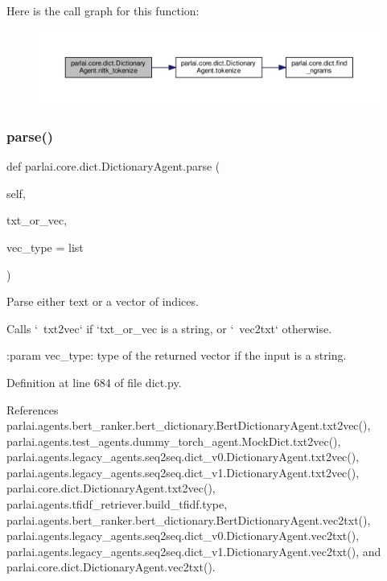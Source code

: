 Here is the call graph for this function\+:
\nopagebreak
\begin{figure}[H]
\begin{center}
\leavevmode
\includegraphics[width=350pt]{classparlai_1_1core_1_1dict_1_1DictionaryAgent_a73fe72e257ace6e8debf2c41995f8390_cgraph}
\end{center}
\end{figure}
\mbox{\label{classparlai_1_1core_1_1dict_1_1DictionaryAgent_ad34c4135329f6768d22d519c3c483d68}} 
\subsubsection{\texorpdfstring{parse()}{parse()}}
{\footnotesize\ttfamily def parlai.\+core.\+dict.\+Dictionary\+Agent.\+parse (\begin{DoxyParamCaption}\item[{}]{self,  }\item[{}]{txt\+\_\+or\+\_\+vec,  }\item[{}]{vec\+\_\+type = {\ttfamily list} }\end{DoxyParamCaption})}

\begin{DoxyVerb}Parse either text or a vector of indices.

Calls `~txt2vec` if `txt_or_vec is a string, or `~vec2txt` otherwise.

:param vec_type:
    type of the returned vector if the input is a string.
\end{DoxyVerb}
 

Definition at line 684 of file dict.\+py.



References parlai.\+agents.\+bert\+\_\+ranker.\+bert\+\_\+dictionary.\+Bert\+Dictionary\+Agent.\+txt2vec(), parlai.\+agents.\+test\+\_\+agents.\+dummy\+\_\+torch\+\_\+agent.\+Mock\+Dict.\+txt2vec(), parlai.\+agents.\+legacy\+\_\+agents.\+seq2seq.\+dict\+\_\+v0.\+Dictionary\+Agent.\+txt2vec(), parlai.\+agents.\+legacy\+\_\+agents.\+seq2seq.\+dict\+\_\+v1.\+Dictionary\+Agent.\+txt2vec(), parlai.\+core.\+dict.\+Dictionary\+Agent.\+txt2vec(), parlai.\+agents.\+tfidf\+\_\+retriever.\+build\+\_\+tfidf.\+type, parlai.\+agents.\+bert\+\_\+ranker.\+bert\+\_\+dictionary.\+Bert\+Dictionary\+Agent.\+vec2txt(), parlai.\+agents.\+legacy\+\_\+agents.\+seq2seq.\+dict\+\_\+v0.\+Dictionary\+Agent.\+vec2txt(), parlai.\+agents.\+legacy\+\_\+agents.\+seq2seq.\+dict\+\_\+v1.\+Dictionary\+Agent.\+vec2txt(), and parlai.\+core.\+dict.\+Dictionary\+Agent.\+vec2txt().



